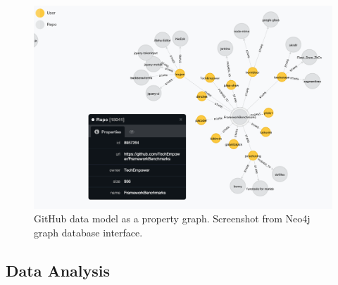\begin{figure}[ht]
\vskip 0.2in
\begin{center}
\centerline{\includegraphics[width=\columnwidth]{images/neo_screenshot.png}}
\caption{GitHub data model as a property graph. Screenshot from Neo4j graph database interface.}
\label{screenshot-data}
\end{center}
\vskip -0.2in
\end{figure} 

\subsection{Data Analysis}

